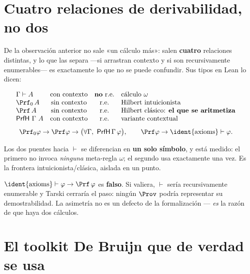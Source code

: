 \section{Cuatro relaciones de derivabilidad, no dos}

De la observación anterior no sale «un cálculo más»: salen \textbf{cuatro} relaciones distintas, y
lo que las separa —si arrastran contexto y si son recursivamente enumerables— es exactamente lo que
no se puede confundir. Sus tipos en Lean lo dicen:


\begin{matematica}
\[
\begin{array}{lccl}
\Gamma \vdash A & \text{con contexto} & \text{\textbf{no} r.e.} & \text{cálculo }\omega\\
\Prf_0\, A      & \text{sin contexto} & \text{r.e.} & \text{Hilbert intuicionista}\\
\Prf\, A        & \text{sin contexto} & \text{r.e.} & \text{Hilbert clásico: \textbf{el que se aritmetiza}}\\
\mathsf{PrfH}\ \Gamma\ A & \text{con contexto} & \text{r.e.} & \text{variante contextual}
\end{array}
\]
\[
  \Prf_0\varphi \to \Prf\varphi \to \bigl(\forall\Gamma,\ \mathsf{PrfH}\,\Gamma\,\varphi\bigr),
  \qquad \Prf\varphi \to \text{\ident{axioms}} \vdash \varphi .
\]
\end{matematica}


Los dos puentes hacia $\vdash$ se diferencian en \textbf{un solo símbolo}, y está medido: el primero
no invoca \emph{ninguna} meta-regla $\omega$; el segundo usa  exactamente una vez. Es la
frontera intuicionista/clásica, aislada en un punto.

\begin{muro}
$\text{\ident{axioms}} \vdash \varphi \to \Prf\,\varphi$ es \textbf{falso}. Si valiera, $\vdash$
sería recursivamente enumerable y Tarski cerraría el paso: ningún $\Prov$ podría representar su
demostrabilidad. La asimetría no es un defecto de la formalización — \emph{es} la razón de que haya
dos cálculos.
\end{muro}

\section{El toolkit De Bruijn que de verdad se usa}

